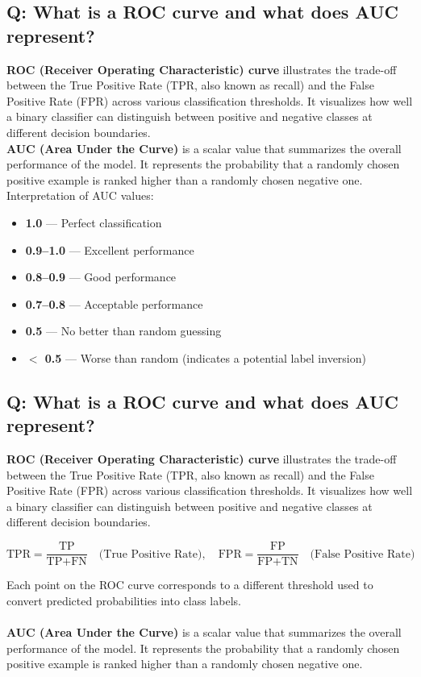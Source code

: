 \subsection*{Q: What is a ROC curve and what does AUC represent?}
\textbf{ROC (Receiver Operating Characteristic) curve} illustrates the trade-off between the True Positive Rate (TPR, also known as recall) and the False Positive Rate (FPR) across various classification thresholds. It visualizes how well a binary classifier can distinguish between positive and negative classes at different decision boundaries. \\
\textbf{AUC (Area Under the Curve)} is a scalar value that summarizes the overall performance of the model. It represents the probability that a randomly chosen positive example is ranked higher than a randomly chosen negative one. Interpretation of AUC values:
\begin{itemize}
	\item \textbf{1.0} — Perfect classification
	\item \textbf{0.9–1.0} — Excellent performance
	\item \textbf{0.8–0.9} — Good performance
	\item \textbf{0.7–0.8} — Acceptable performance
	\item \textbf{0.5} — No better than random guessing
	\item \textbf{$<$ 0.5} — Worse than random (indicates a potential label inversion)
\end{itemize}

\subsection*{Q: What is a ROC curve and what does AUC represent?}
\textbf{ROC (Receiver Operating Characteristic) curve} illustrates the trade-off between the True Positive Rate (TPR, also known as recall) and the False Positive Rate (FPR) across various classification thresholds. It visualizes how well a binary classifier can distinguish between positive and negative classes at different decision boundaries.

\[
	\text{TPR} = \frac{\text{TP}}{\text{TP} + \text{FN}} \quad \text{(True Positive Rate)}, \quad
	\text{FPR} = \frac{\text{FP}}{\text{FP} + \text{TN}} \quad \text{(False Positive Rate)}
\]

Each point on the ROC curve corresponds to a different threshold used to convert predicted probabilities into class labels. \\ \\
\textbf{AUC (Area Under the Curve)} is a scalar value that summarizes the overall performance of the model. It represents the probability that a randomly chosen positive example is ranked higher than a randomly chosen negative one.

